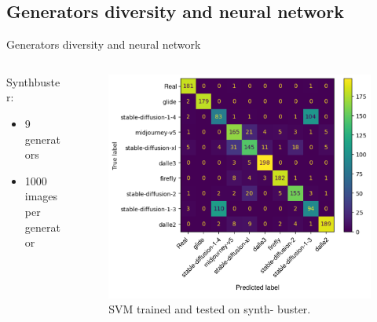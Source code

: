 \documentclass[11pt,compress]{beamer} %
\begin{document}
\subsection{Generators diversity and neural network}
\begin{frame}{Generators diversity and neural network}
  \begin{columns}
    \begin{column}{.4\textwidth}
      Synthbuster:
      \begin{itemize}
        \item 9 generators
        \item 1000 images per generator
      \end{itemize}
    \end{column}
    \pause
    \begin{column}{.6\textwidth}
      \begin{figure}
        \includegraphics[width=\textwidth]{img/confusion.png}
        \caption{SVM trained and tested on synth-
        buster.}
      \end{figure}
    \end{column}
  \end{columns}
\end{frame}

\end{document}
